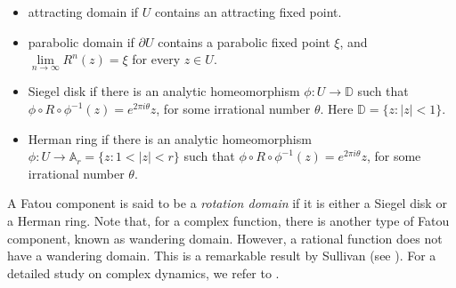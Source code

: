 \documentclass[12pt]{article}
\begin{document}
\begin{itemize}
	\item attracting domain if $U$ contains an attracting fixed point.
	\item parabolic domain if $\partial U$ contains a parabolic fixed point $\xi$, and $\lim\limits_{n \to \infty}R^n(z)=\xi$ for every $z\in U$.
	\item Siegel disk if there is an analytic homeomorphism $\phi: U \to \mathbb{D}$ such that $\phi \circ R \circ \phi^{-1}(z)=e^{2\pi i \theta}z$, for some irrational number $\theta$. Here $\mathbb{D}=\{z : |z| <	1\}$.
	\item Herman ring if there is an analytic homeomorphism $\phi: U \to \mathbb{A}_r=\{z : 1<|z| <r \}$ such that $\phi \circ R \circ \phi^{-1}(z)=e^{2\pi i \theta}z$, for some irrational number $\theta$.
\end{itemize}
A Fatou component is said to be a \textit{rotation domain} if it is either a Siegel disk or a Herman ring. Note that, for a complex function, there is another type of Fatou component, known as wandering domain. However, a rational function does not have a wandering domain. This is a remarkable result by Sullivan (see \cite[Theorem~8.1.2]{Beardon_book}). For a detailed study on complex dynamics, we refer to \cite{Beardon_book,CG1993,Milnor_book}.
%
\end{document}
